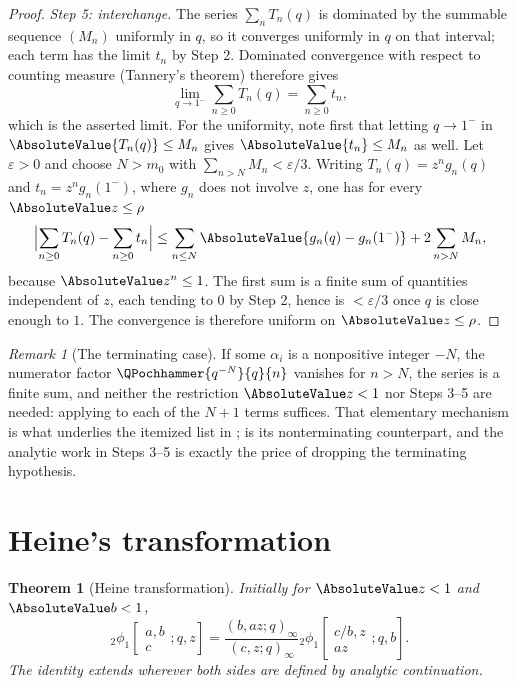 \documentclass[11pt,a4paper,oneside,openany]{book}
\newtheorem{theorem}{Theorem}[chapter]
\theoremstyle{definition}
\theoremstyle{remark}
\newtheorem{remark}[remark]{Remark}
\begin{document}
\begin{proof}
\emph{Step 5: interchange.}
The series $\sum_nT_n(q)$ is dominated by the summable sequence $(M_n)$ uniformly in $q$, so it converges uniformly in $q$ on that interval; each term has the limit $t_n$ by Step 2.  Dominated convergence with respect to counting measure (Tannery's theorem) therefore gives
\[
 \lim_{q\to1^-}\sum_{n\ge0}T_n(q)=\sum_{n\ge0}t_n,
\]
which is the asserted limit.  %
For the uniformity, note first that letting $q\to1^-$ in
$\AbsoluteValue{T_n(q)}\le M_n$ gives $\AbsoluteValue{t_n}\le M_n$ as well.  Let $\varepsilon>0$ and
choose $N>m_0$ with $\sum_{n>N}M_n<\varepsilon/3$.  Writing $T_n(q)=z^ng_n(q)$ and
$t_n=z^ng_n(1^-)$, where $g_n$ does not involve $z$, one has for every
$\AbsoluteValue z\le\rho$
\[
 \Bigl\lvert\sum_{n\ge0}T_n(q)-\sum_{n\ge0}t_n\Bigr\rvert
 \le\sum_{n\le N}\AbsoluteValue{g_n(q)-g_n(1^-)}+2\sum_{n>N}M_n,
\]
because $\AbsoluteValue z^n\le1$.  The first sum is a finite sum of quantities
independent of $z$, each tending to $0$ by Step 2, hence is $<\varepsilon/3$ once
$q$ is close enough to $1$.  The convergence is therefore uniform on
$\AbsoluteValue z\le\rho$.
\end{proof}

\begin{remark}[The terminating case]\label{rem:classical-limit-terminating}
If some $\alpha_i$ is a nonpositive integer $-N$, the numerator factor $\QPochhammer{q^{-N}}{q}{n}$ vanishes for $n>N$, the series is a finite sum, and neither the restriction $\AbsoluteValue z<1$ nor Steps 3--5 are needed: applying  to each of the $N+1$ terms suffices.  That elementary mechanism is what underlies the itemized list in ;  is its nonterminating counterpart, and the analytic work in Steps 3--5 is exactly the price of dropping the terminating hypothesis.
\end{remark}

\section{Heine's transformation}

\begin{theorem}[Heine transformation]\label{thm:heine}
Initially for $\AbsoluteValue z<1$ and $\AbsoluteValue b<1$,
\[
 {}_2\phi_1\!\left[\begin{matrix}a,b\\c\end{matrix};q,z\right]
 =\frac{(b,az;q)_\infty}{(c,z;q)_\infty}
 {}_2\phi_1\!\left[\begin{matrix}c/b,z\\az\end{matrix};q,b\right].
\]
The identity extends wherever both sides are defined by analytic continuation.
\end{theorem}
\end{document}
